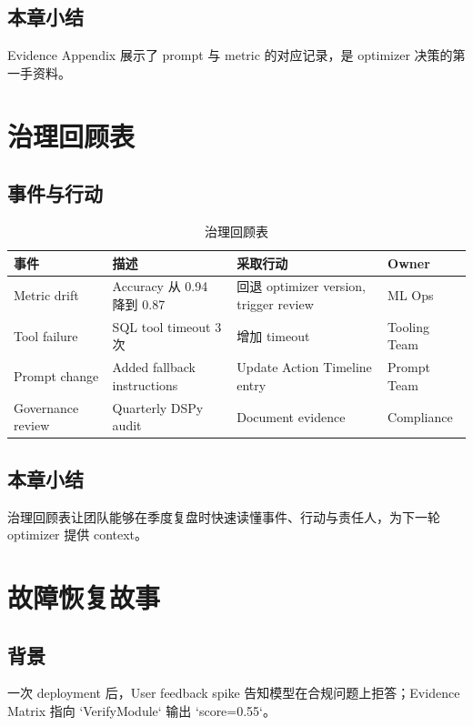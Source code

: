 \documentclass[a4paper]{article}
\begin{document}
\subsection{本章小结}

Evidence Appendix 展示了 prompt 与 metric 的对应记录，是 optimizer 决策的第一手资料。

\section{治理回顾表}

\subsection{事件与行动}

\begin{table}[H]
\centering
\caption{治理回顾表}
\begin{tabular}{p{}p{}p{}p{}}
\toprule
事件 & 描述 & 采取行动 & Owner \\
\midrule
Metric drift & Accuracy 从 0.94 降到 0.87 & 回退 optimizer version, trigger review & ML Ops \\
Tool failure & SQL tool timeout 3 次 & 增加 timeout & Tooling Team \\
Prompt change & Added fallback instructions & Update Action Timeline entry & Prompt Team \\
Governance review & Quarterly DSPy audit & Document evidence & Compliance \\
\bottomrule
\end{tabular}
\end{table}

\subsection{本章小结}

治理回顾表让团队能够在季度复盘时快速读懂事件、行动与责任人，为下一轮 optimizer 提供 context。

\section{故障恢复故事}

\subsection{背景}

一次 deployment 后，User feedback spike 告知模型在合规问题上拒答；Evidence Matrix 指向 `VerifyModule` 输出 `score=0.55`。
\end{document}
